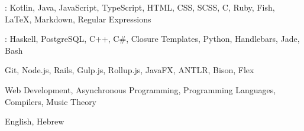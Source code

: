 
\begin{cvparagraph}
    : Kotlin, Java, JavaScript, TypeScript, HTML, CSS, SCSS, C, Ruby, Fish, LaTeX, Markdown, Regular Expressions

    : Haskell, PostgreSQL, C++, C\#, Closure Templates, Python, Handlebars, Jade, Bash

     Git, Node.js, Rails, Gulp.js, Rollup.js, JavaFX, ANTLR, Bison, Flex

     Web Development, Asynchronous Programming, Programming Languages, Compilers, Music Theory

     English, Hebrew
\end{cvparagraph}
